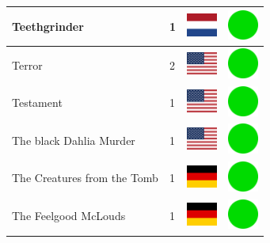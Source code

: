 \documentclass[12pt, a4paper, twoside]{report}
\begin{document}
\begin{center}
\begin{longtable}{|p{5cm}|p{2cm}|p{2cm}|p{2cm}|}
			Teethgrinder & 1 & \includegraphics[width=1cm]{4x3/nl} & \includegraphics[width=1cm]{likes/y} \\ \hline
			Terror & 2 & \includegraphics[width=1cm]{4x3/us} & \includegraphics[width=1cm]{likes/y} \\ \hline
			Testament & 1 & \includegraphics[width=1cm]{4x3/us} & \includegraphics[width=1cm]{likes/y} \\ \hline
			The black Dahlia Murder & 1 & \includegraphics[width=1cm]{4x3/us} & \includegraphics[width=1cm]{likes/y} \\ \hline
			The Creatures from the Tomb & 1 & \includegraphics[width=1cm]{4x3/de} & \includegraphics[width=1cm]{likes/y} \\ \hline
			The Feelgood McLouds & 1 & \includegraphics[width=1cm]{4x3/de} & \includegraphics[width=1cm]{likes/y} \\ \hline

\end{longtable}
\end{center}
\end{document}
